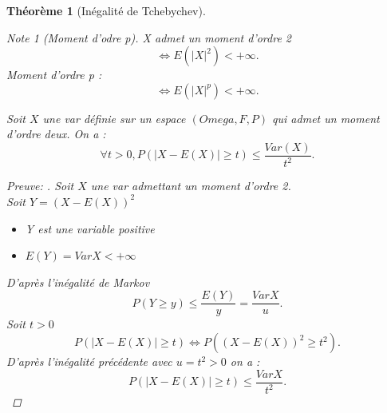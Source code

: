 \documentclass{article}
\theoremstyle{plain}%
\newtheorem{thm}{Théorème}[section]
\theoremstyle{definition}
\theoremstyle{remark}
\newtheorem*{note}{Note}
\begin{document}
\begin{thm}[Inégalité de Tchebychev]
    \begin{note}[Moment d'odre p]
        X admet un moment d'ordre 2
        \[
            \Leftrightarrow E(\left| X \right| ^2) < + \infty 
        .\]
        Moment d'ordre p : 
        \[
            \Leftrightarrow E(\left| X \right| ^p ) < + \infty 
        .\]
    \end{note}
    Soit $ X $ une var définie sur un espace $ (Omega, F, P) $ qui admet un moment d'ordre deux. On a :  
    \[
        \forall t > 0, P(\left| X-E(X) \right| \geq t) \leq \frac{Var(X)}{t^2}
    .\]
    \begin{proof}[Preuve: ]
        Soit $ X $ une var admettant un moment d'ordre 2.\\
        Soit $ Y=(X-E(X))^2 $\begin{itemize}
            \item Y est une variable positive
            \item $ E(Y) = Var X < + \infty $ 
        \end{itemize}
        D'après l'inégalité de Markov 
        \[
            P(Y \geq y) \leq \frac{E(Y)}{y} = \frac{Var X}{u}
        .\]
        Soit $ t>0 $  
        \[
            P(\left| X-E(X) \right| \geq t ) \Leftrightarrow P((X-E(X))^2 \geq t^2)
        .\]
        D'après l'inégalité précédente avec $ u = t^2 > 0 $ on a : 
        \[
            P(\left| X-E(X) \right| \geq t) \leq \frac{Var X}{t^2}
        .\]        
    \end{proof}
\end{thm}
\end{document}
